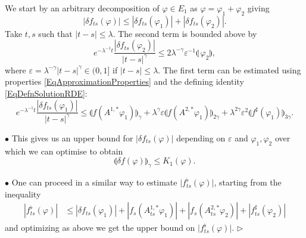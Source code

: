 \documentclass[11pt,a4paper]{amsart}
\renewcommand{\leq}{\leqslant}
\newcommand{\ssk}{\smallskip}
\numberwithin{equation}{section} %
\newenvironment{Dem}{%
    \begin{list}{\hspace{0.5cm}{\sc Proof --}}{%
        \setlength{\topsep}{0pt}%
        \setlength{\leftmargin}{0pt}%
        \setlength{\rightmargin}{0pt}%
        \setlength{\listparindent}{0pt}%
        \setlength{\itemindent}{0pt}%
        \setlength{\parsep}{0pt}%
        \addtolength{\leftmargin}{20pt}%
        \addtolength{\rightmargin}{0pt}%
    } \item }{\hfill{\space $\rhd$}\end{list}\smallskip}
\begin{document}
\begin{Dem}
We start by an arbitrary decomposition of $\varphi\in E_1$ as $\varphi = \varphi_1 + \varphi_2$ giving
$$
|\delta f_{ts}(\varphi)| \leq |\delta f_{ts}(\varphi_1)| + |\delta f_{ts}(\varphi_2)|.
$$
Take $t,s$ such that ${|t-s|\le \lambda}$. The second term is bounded above by 
$$
e^{-\lambda^{-1}t} \frac{|\delta f_{ts}(\varphi_2)|}{|t-s|^\gamma} \leq  2 \lambda^{-\gamma}\varepsilon^{-1}\llparenthesis\, \varphi_2 \rrparenthesis ,
$$ 
where  $\varepsilon = \lambda^{-\gamma} | t - s |^\gamma \in(0,1]$ if $|t-s|\le \lambda$.
The first term can be estimated using properties \eqref{EqApproximationProperties} and the defining identity \eqref{EqDefnSolutionRDE}:
$$
e^{-\lambda^{-1}t} \frac{|\delta f_{ts}(\varphi_1)|}{|t-s|^\gamma} \leq
\llparenthesis  f(A^{1,*} \varphi_1) \rrparenthesis_\gamma
+ \lambda^{\gamma} \varepsilon  \llparenthesis f( A^{2,*} \varphi_1) \rrparenthesis_{2\gamma}  
+ \lambda^{2\gamma}\varepsilon^2 \llparenthesis f^\sharp (  \varphi_1) \rrparenthesis_{3\gamma}.
$$ 

\medskip

$\bullet$  This gives us an upper bound for $\big|\delta f_{ts}(\varphi)\big|$ depending on $\varepsilon$ and $\varphi_1, \varphi_2$ over which we can optimise to obtain
\begin{equation*}
\llparenthesis \delta f(\varphi) \rrparenthesis_\gamma \leq  K_1(\varphi) .
\end{equation*}

\ssk

$\bullet$ One can proceed in a similar way to estimate $\big|f^\flat_{ts}(\varphi)\big|$, starting from the inequality
\begin{equation*}
\begin{split}
| f^\flat_{ts}(\varphi)| &\leq | \delta f_{ts}(\varphi_1)| + | f_s(A^{1,*}_{ts}\varphi_1)| + | f_s(A^{2,*}_{ts}\varphi_2)| + |f^\sharp_{ts}(\varphi_2)|
\end{split}
\end{equation*}
and optimizing as above we get the upper bound on $\big|f^\flat_{ts}(\varphi)\big|$.
\end{Dem}

\medskip
\end{document}
